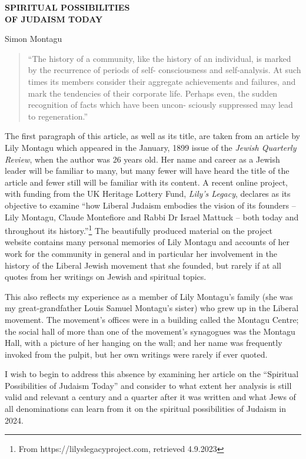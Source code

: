 \documentclass[12pt, extrafontsizes, twopage, a5paper]{memoir}
\begin{document}
{
  \centering\LARGE\bfseries SPIRITUAL POSSIBILITIES\\OF JUDAISM TODAY

  \Large Simon Montagu

  }

\begin{quotation}
``The history of a community, like the history of an 
individual, is marked by the recurrence of periods of self- 
consciousness and self-analysis. At such times its members 
consider their aggregate achievements and failures, and 
mark the tendencies of their corporate life. Perhaps even, 
the sudden recognition of facts which have been uncon- 
sciously suppressed may lead to regeneration.''
\end{quotation}

The first paragraph of this article, as well as its title, are taken from an article by Lily Montagu which appeared in the January, 1899 issue of the \textsl{Jewish Quarterly Review}, when the author was 26 years old. Her name and career as a Jewish leader will be familiar to many, but many fewer will have heard the title of the article and fewer still will be familiar with its content. A recent online project, with funding from the UK Heritage Lottery Fund, \textsl{Lily's Legacy}, declares as its objective to examine ``how Liberal Judaism embodies the vision of its founders -- Lily Montagu, Claude Montefiore and Rabbi Dr Israel Mattuck -- both today and throughout its history.''\footnote{From https://lilyslegacyproject.com, retrieved 4.9.2023} The beautifully produced material on the project website contains many personal memories of Lily Montagu and accounts of her work for the community in general and in particular her involvement in the history of the Liberal Jewish movement that she founded, but rarely if at all quotes from her writings on Jewish and spiritual topics.

This also reflects my experience as a member of Lily Montagu's family (she was my great-grandfather Louis Samuel Montagu's sister) who grew up in the Liberal movement. The movement's offices were in a building called the Montagu Centre; the social hall of more than one of the movement's synagogues was the Montagu Hall, with a picture of her hanging on the wall; and her name was frequently invoked from the pulpit, but her own writings were rarely if ever quoted.

I wish to begin to address this absence by examining her article on the ``Spiritual Possibilities of Judaism Today'' and consider to what extent her analysis is still valid and relevant a century and a quarter after it was written and what Jews of all denominations can learn from it on the spiritual possibilities of Judaism in 2024.
\end{document}
